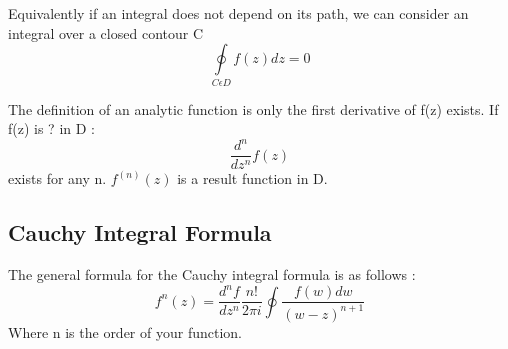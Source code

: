 \documentclass{article}
\newcommand{\be}{\begin{equation}}
\newcommand{\ee}{\end{equation}}
\begin{document}
Equivalently if an integral does not depend on its path, we can consider an integral over a closed contour C
\be
\oint\limits_{C \epsilon D} f(z) dz = 0
\ee

The definition of an analytic function is only the first derivative of f(z) exists.
If f(z) is ? in D :
\be
\frac{d^n}{dz^n} f(z)
\ee
exists for any n. $f^(n)(z)$ is a result function in D.


\subsection*{Cauchy Integral Formula}
The general formula for the Cauchy integral formula is as follows :
\be
f^{n}(z) = \frac{d^n f}{dz^n}  \frac{n!}{2\pi i } \oint \frac{f(w) dw}{(w-z)^{n+1}}
\ee
Where n is the order of your function.
\end{document}
